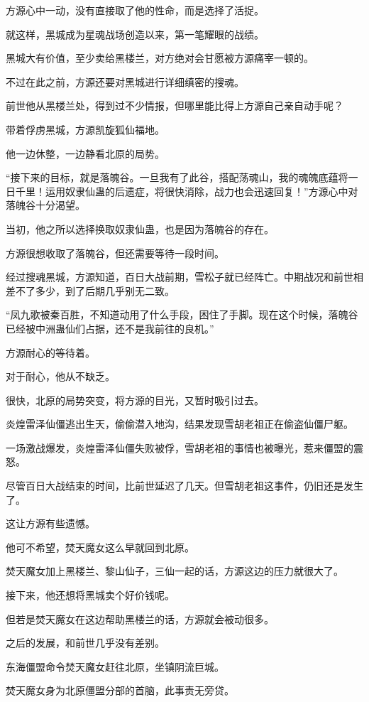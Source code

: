 \begin{this_body}
方源心中一动，没有直接取了他的性命，而是选择了活捉。

就这样，黑城成为星魂战场创造以来，第一笔耀眼的战绩。

黑城大有价值，至少卖给黑楼兰，对方绝对会甘愿被方源痛宰一顿的。

不过在此之前，方源还要对黑城进行详细缜密的搜魂。

前世他从黑楼兰处，得到过不少情报，但哪里能比得上方源自己亲自动手呢？

带着俘虏黑城，方源凯旋狐仙福地。

他一边休整，一边静看北原的局势。

“接下来的目标，就是落魄谷。一旦我有了此谷，搭配荡魂山，我的魂魄底蕴将一日千里！运用奴隶仙蛊的后遗症，将很快消除，战力也会迅速回复！”方源心中对落魄谷十分渴望。

当初，他之所以选择换取奴隶仙蛊，也是因为落魄谷的存在。

方源很想收取了落魄谷，但还需要等待一段时间。

经过搜魂黑城，方源知道，百日大战前期，雪松子就已经阵亡。中期战况和前世相差不了多少，到了后期几乎别无二致。

“凤九歌被秦百胜，不知道动用了什么手段，困住了手脚。现在这个时候，落魄谷已经被中洲蛊仙们占据，还不是我前往的良机。”

方源耐心的等待着。

对于耐心，他从不缺乏。

很快，北原的局势突变，将方源的目光，又暂时吸引过去。

炎煌雷泽仙僵逃出生天，偷偷潜入地沟，结果发现雪胡老祖正在偷盗仙僵尸躯。

一场激战爆发，炎煌雷泽仙僵失败被俘，雪胡老祖的事情也被曝光，惹来僵盟的震怒。

尽管百日大战结束的时间，比前世延迟了几天。但雪胡老祖这事件，仍旧还是发生了。

这让方源有些遗憾。

他可不希望，焚天魔女这么早就回到北原。

焚天魔女加上黑楼兰、黎山仙子，三仙一起的话，方源这边的压力就很大了。

接下来，他还想将黑城卖个好价钱呢。

但若是焚天魔女在这边帮助黑楼兰的话，方源就会被动很多。

之后的发展，和前世几乎没有差别。

东海僵盟命令焚天魔女赶往北原，坐镇阴流巨城。

焚天魔女身为北原僵盟分部的首脑，此事责无旁贷。


\end{this_body}
